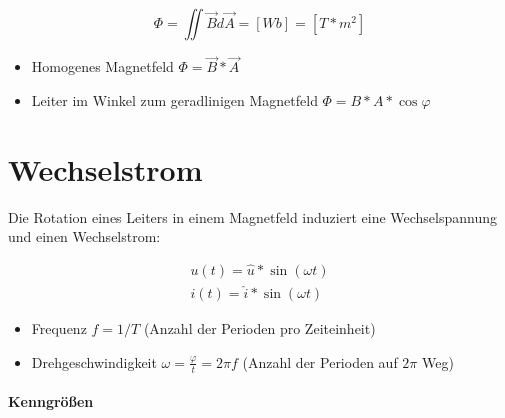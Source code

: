 $$\Phi = \iint \vec{B} d \vec{A} = [Wb] = [T * m^2]$$

\begin{itemize}
  \item Homogenes Magnetfeld $\Phi = \vec{B} * \vec{A}$
  \item Leiter im Winkel zum geradlinigen Magnetfeld $\Phi = B * A * \cos \varphi$
\end{itemize}

\section{Wechselstrom}

Die Rotation eines Leiters in einem Magnetfeld induziert eine Wechselspannung und einen Wechselstrom:

\begin{gather*}
  u(t) = \hat{u} * \sin(\omega t) \\
  i(t) = \hat{i} * \sin(\omega t)
\end{gather*}

\begin{itemize}
  \item Frequenz $f = 1/T$ (Anzahl der Perioden pro Zeiteinheit)
  \item Drehgeschwindigkeit $\omega = \frac{\varphi}{t} = 2 \pi f$ (Anzahl der Perioden auf $2\pi$ Weg)
\end{itemize}

\paragraph{Kenngrö\ss en}

